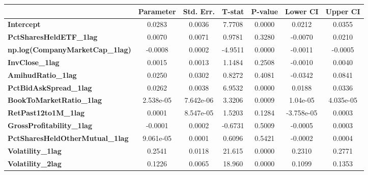 \begin{center}
\begin{tabular}{lclc}
\bottomrule
\end{tabular}
\begin{tabular}{lcccccc}
                                        & \textbf{Parameter} & \textbf{Std. Err.} & \textbf{T-stat} & \textbf{P-value} & \textbf{Lower CI} & \textbf{Upper CI}  \\
\midrule
\textbf{Intercept}                      &       0.0283       &       0.0036       &      7.7708     &      0.0000      &       0.0212      &       0.0355       \\
\textbf{PctSharesHeldETF\_1lag}         &       0.0070       &       0.0071       &      0.9781     &      0.3280      &      -0.0070      &       0.0210       \\
\textbf{np.log(CompanyMarketCap\_1lag)} &      -0.0008       &       0.0002       &     -4.9511     &      0.0000      &      -0.0011      &      -0.0005       \\
\textbf{InvClose\_1lag}                 &       0.0015       &       0.0013       &      1.1484     &      0.2508      &      -0.0010      &       0.0040       \\
\textbf{AmihudRatio\_1lag}              &       0.0250       &       0.0302       &      0.8272     &      0.4081      &      -0.0342      &       0.0841       \\
\textbf{PctBidAskSpread\_1lag}          &       0.0262       &       0.0038       &      6.9532     &      0.0000      &       0.0188      &       0.0336       \\
\textbf{BookToMarketRatio\_1lag}        &     2.538e-05      &     7.642e-06      &      3.3206     &      0.0009      &      1.04e-05     &     4.035e-05      \\
\textbf{RetPast12to1M\_1lag}            &       0.0001       &     8.547e-05      &      1.5203     &      0.1284      &     -3.758e-05    &       0.0003       \\
\textbf{GrossProfitability\_1lag}       &      -0.0001       &       0.0002       &     -0.6731     &      0.5009      &      -0.0005      &       0.0003       \\
\textbf{PctSharesHeldOtherMutual\_1lag} &     9.061e-05      &       0.0001       &      0.6096     &      0.5421      &      -0.0002      &       0.0004       \\
\textbf{Volatility\_1lag}               &       0.2541       &       0.0118       &      21.615     &      0.0000      &       0.2310      &       0.2771       \\
\textbf{Volatility\_2lag}               &       0.1226       &       0.0065       &      18.960     &      0.0000      &       0.1099      &       0.1353       \\

\end{tabular}
\end{center}
